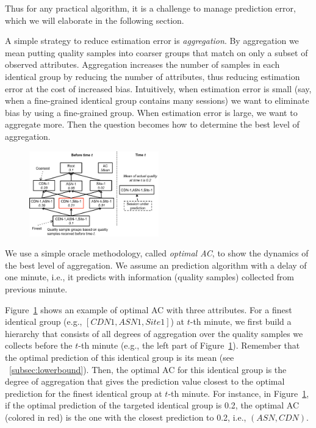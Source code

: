 Thus for any practical algorithm, it is a challenge to manage prediction error, which we will elaborate in the following section.

\label{subsec:aggregation}
A simple strategy to reduce estimation error is {\it aggregation}.  By aggregation we mean putting quality samples into coarser groups that match on only a subset of observed attributes.  Aggregation increases the number of samples in each identical group by reducing the number of attributes, thus reducing estimation error at the cost of increased bias. 
Intuitively, when estimation error is small (say, when a fine-grained identical group contains many sessions) we want to eliminate bias by using a fine-grained group.  When estimation error is large, we want to aggregate more. 
Then the question becomes how to determine the best level of aggregation.


\begin{figure}[h!]
\centering
 \includegraphics[width=0.5\textwidth] {figures/fig-optimal-AC.pdf}
\label{fig:example-optimal-ac}
\end{figure}

 We use a simple oracle methodology, called {\it optimal AC}, to show the dynamics of the best level of aggregation. We assume an prediction algorithm with a delay of one minute, i.e., it predicts with information (quality samples) collected from previous minute.

Figure~\ref{fig:example-optimal-ac} shows an example of optimal AC with three attributes. For a finest identical group (e.g., $[CDN1,ASN1,Site1]$) at $t$-th minute, we first build a hierarchy that consists of all degrees of aggregation over the quality samples we collects before the $t$-th minute (e.g., the left part of Figure~\ref{fig:example-optimal-ac}). 
Remember that the optimal prediction of this identical group is its mean (see \Section~\ref{subsec:lowerbound}). 
Then, the optimal AC for this identical group is the degree of aggregation that gives the prediction value closest to the optimal prediction for the finest identical group at $t$-th minute. 
For instance, in Figure~\ref{fig:example-optimal-ac}, if the optimal prediction of the targeted identical group is 0.2, the optimal AC (colored in red) is the one with the closest prediction to 0.2, i.e., $(ASN, CDN)$. 

